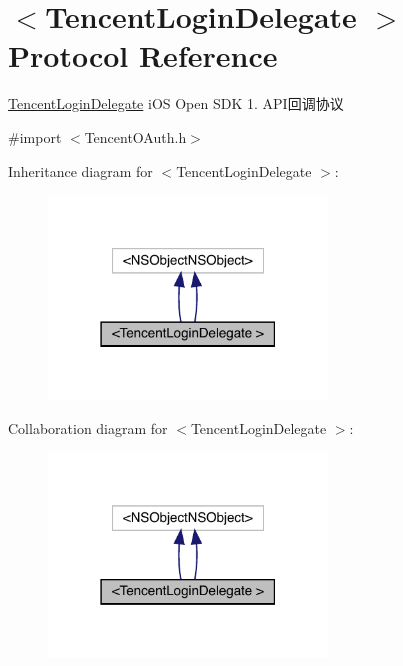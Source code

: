 \hypertarget{protocol_tencent_login_delegate_01-p}{}\section{$<$Tencent\+Login\+Delegate $>$ Protocol Reference}
\label{protocol_tencent_login_delegate_01-p}


\mbox{\hyperlink{class_tencent_login_delegate-p}{Tencent\+Login\+Delegate}} i\+OS Open S\+DK 1. A\+P\+I回调协议  




{\ttfamily \#import $<$Tencent\+O\+Auth.\+h$>$}



Inheritance diagram for $<$Tencent\+Login\+Delegate $>$\+:\nopagebreak
\begin{figure}[H]
\begin{center}
\leavevmode
\includegraphics[width=210pt]{protocol_tencent_login_delegate_01-p__inherit__graph}
\end{center}
\end{figure}


Collaboration diagram for $<$Tencent\+Login\+Delegate $>$\+:\nopagebreak
\begin{figure}[H]
\begin{center}
\leavevmode
\includegraphics[width=210pt]{protocol_tencent_login_delegate_01-p__coll__graph}
\end{center}
\end{figure}
